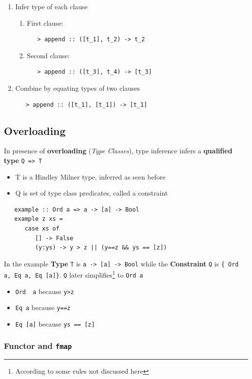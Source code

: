 \begin{enumerate}
   \item Infer type of each clause
   \begin{enumerate}
      \item First clause:
      \begin{lstlisting}
   > append :: ([t_1], t_2) -> t_2
      \end{lstlisting}
      \item Second clause:
      \begin{lstlisting}
   > append :: ([t_3], t_4) -> [t_3]
      \end{lstlisting}
   \end{enumerate}
   \item Combine by equating types of two clauses
   \begin{lstlisting}
   > append :: ([t_1], [t_1]) -> [t_1]
   \end{lstlisting}
\end{enumerate}

\subsection{Overloading}
In presence of \textbf{overloading} (\textit{Type Classes}), type inference infers a \textbf{qualified type} \lstinline|Q => T|
\begin{itemize}
   \item T is a Hindley Milner type, inferred as seen before
   \item Q is set of type class predicates, called a constraint
\end{itemize}
\begin{lstlisting}
   example :: Ord a => a -> [a] -> Bool
   example z xs = 
      case xs of
         [] -> False
         (y:ys) -> y > z || (y==z && ys == [z])
\end{lstlisting}

\begin{paracol}{2}
   \colfill
   In the example \textbf{Type} \lstinline|T| is \lstinline|a -> [a] -> Bool|
   while the \textbf{Constraint} \lstinline|Q| is \lstinline|{ Ord a, Eq a, Eq [a]}|.
   \lstinline|Q| later simplifies\footnote{According to some rules not discussed here} to \lstinline|Ord a|
   \colfill
   \switchcolumn

   \begin{itemize}
      \item \lstinline|Ord  a| because \lstinline|y>z|
      \item \lstinline|Eq a| because \lstinline|y==z|
      \item \lstinline|Eq [a]| because \lstinline|ys == [z]|
   \end{itemize}
\end{paracol}
\subsubsection{Functor and \texttt{fmap}}